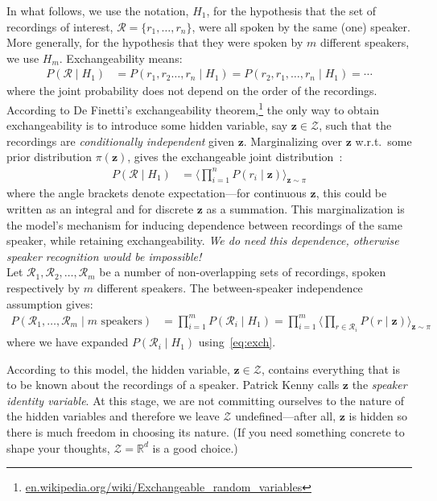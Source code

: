 \documentclass[a4paper,oneside,12pt,english]{report}
\def\zvec{\mathbf{z}}
\def\expv#1#2{\bigl\langle#1\bigr\rangle_{#2}}
\def\R{\mathbb{R}}
\def\Zset{\mathcal{Z}}
\def\Rset{\mathcal{R}}
\def\Zset{\mathcal{Z}}
\begin{document}
\noindent In what follows, we use the notation, $H_1$, for the hypothesis that the set of recordings of interest, $\Rset=\{r_1,\ldots,r_n\}$, were all spoken by the same (one) speaker. More generally, for the hypothesis that they were spoken by $m$ different speakers, we use $H_m$. Exchangeability means:
\begin{align*}
P(\Rset\mid H_1) &= P(r_1,r_2\ldots,r_n\mid H_1) = P(r_2,r_1,\ldots,r_n\mid H_1) = \cdots
\end{align*}
where the joint probability does not depend on the order of the recordings. According to De Finetti's exchangeability theorem,\footnote{\url{en.wikipedia.org/wiki/Exchangeable_random_variables}} the only way to obtain exchangeability is to introduce some hidden variable, say $\zvec\in\Zset$, such that the recordings are \emph{conditionally independent} given $\zvec$. Marginalizing over $\zvec$ w.r.t.\ some prior distribution $\pi(\zvec)$, gives the exchangeable joint distribution~\cite{Chow}:  
\begin{align}
\label{eq:exch}
P(\Rset\mid H_1) &= \expv{\prod_{i=1}^n P(r_i\mid \zvec)}{\zvec\sim\pi}
\end{align}
where the angle brackets denote expectation---for continuous $\zvec$, this could be written as an integral and for discrete $\zvec$ as a summation. This marginalization is the model's mechanism for inducing dependence between recordings of the same speaker, while retaining exchangeability. \emph{We do need this dependence, otherwise speaker recognition would be impossible!}\\

\noindent Let $\Rset_1,\Rset_2,\ldots,\Rset_m$ be a number of non-overlapping sets of recordings, spoken respectively by $m$ different speakers. The between-speaker independence assumption gives:
\begin{align}
\label{eq:iid}
P(\Rset_1,\ldots,\Rset_m\mid\text{$m$ speakers}) &= \prod_{i=1}^m P(\Rset_i\mid H_1) = \prod_{i=1}^m \expv{\prod_{r\in\Rset_i} P(r\mid\zvec)}{\zvec\sim\pi}   
\end{align}
where we have expanded $P(\Rset_i\mid H_1)$ using~\eqref{eq:exch}.

According to this model, the hidden variable, $\zvec\in\Zset$, contains everything that is to be known about the recordings of a speaker. Patrick Kenny calls $\zvec$ the \emph{speaker identity variable}. At this stage, we are not committing ourselves to the nature of the hidden variables and therefore we leave $\Zset$ undefined---after all, $\zvec$ is hidden so there is much freedom in choosing its nature. (If you need something concrete to shape your thoughts, $\Zset=\R^d$ is a good choice.) 
\end{document}
